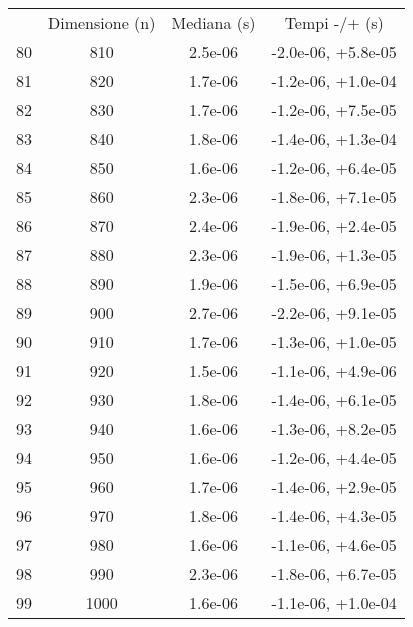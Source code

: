 \begin{table}
\centering
\begin{adjustbox}{width=1\textwidth/2}
\begin{tabular}{|c|c|c|c|}
\hline
 & Dimensione (n) & Mediana (s) & Tempi -/+ (s) \\
80 & 810 & 2.5e-06 & -2.0e-06, +5.8e-05 \\
\cline{1-4}
81 & 820 & 1.7e-06 & -1.2e-06, +1.0e-04 \\
\cline{1-4}
82 & 830 & 1.7e-06 & -1.2e-06, +7.5e-05 \\
\cline{1-4}
83 & 840 & 1.8e-06 & -1.4e-06, +1.3e-04 \\
\cline{1-4}
84 & 850 & 1.6e-06 & -1.2e-06, +6.4e-05 \\
\cline{1-4}
85 & 860 & 2.3e-06 & -1.8e-06, +7.1e-05 \\
\cline{1-4}
86 & 870 & 2.4e-06 & -1.9e-06, +2.4e-05 \\
\cline{1-4}
87 & 880 & 2.3e-06 & -1.9e-06, +1.3e-05 \\
\cline{1-4}
88 & 890 & 1.9e-06 & -1.5e-06, +6.9e-05 \\
\cline{1-4}
89 & 900 & 2.7e-06 & -2.2e-06, +9.1e-05 \\
\cline{1-4}
90 & 910 & 1.7e-06 & -1.3e-06, +1.0e-05 \\
\cline{1-4}
91 & 920 & 1.5e-06 & -1.1e-06, +4.9e-06 \\
\cline{1-4}
92 & 930 & 1.8e-06 & -1.4e-06, +6.1e-05 \\
\cline{1-4}
93 & 940 & 1.6e-06 & -1.3e-06, +8.2e-05 \\
\cline{1-4}
94 & 950 & 1.6e-06 & -1.2e-06, +4.4e-05 \\
\cline{1-4}
95 & 960 & 1.7e-06 & -1.4e-06, +2.9e-05 \\
\cline{1-4}
96 & 970 & 1.8e-06 & -1.4e-06, +4.3e-05 \\
\cline{1-4}
97 & 980 & 1.6e-06 & -1.1e-06, +4.6e-05 \\
\cline{1-4}
98 & 990 & 2.3e-06 & -1.8e-06, +6.7e-05 \\
\cline{1-4}
99 & 1000 & 1.6e-06 & -1.1e-06, +1.0e-04 \\
\cline{1-4}
\end{tabular}
\end{adjustbox}
\end{table}
